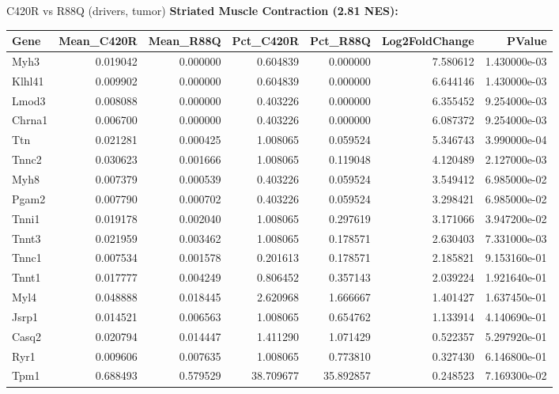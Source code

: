 \documentclass[10pt, aspectratio=169]{beamer}
\begin{document}
\begin{frame}{C420R vs R88Q (drivers, tumor)}
  \centering
  {\small \textbf{Striated Muscle Contraction (2.81 NES):}}\par
  \vspace{0.15cm}
  \tiny
  \begin{tabular}{l r r r r r r}
    \toprule
    \textbf{Gene} & \textbf{Mean\_C420R} & \textbf{Mean\_R88Q} & \textbf{Pct\_C420R} & \textbf{Pct\_R88Q} & \textbf{Log2FoldChange} & \textbf{PValue} \\
    \midrule
    Myh3 & 0.019042 & 0.000000 & 0.604839 & 0.000000 & 7.580612 & 1.430000e-03 \\
    Klhl41 & 0.009902 & 0.000000 & 0.604839 & 0.000000 & 6.644146 & 1.430000e-03 \\
    Lmod3 & 0.008088 & 0.000000 & 0.403226 & 0.000000 & 6.355452 & 9.254000e-03 \\
    Chrna1 & 0.006700 & 0.000000 & 0.403226 & 0.000000 & 6.087372 & 9.254000e-03 \\
    Ttn & 0.021281 & 0.000425 & 1.008065 & 0.059524 & 5.346743 & 3.990000e-04 \\
    Tnnc2 & 0.030623 & 0.001666 & 1.008065 & 0.119048 & 4.120489 & 2.127000e-03 \\
    Myh8 & 0.007379 & 0.000539 & 0.403226 & 0.059524 & 3.549412 & 6.985000e-02 \\
    Pgam2 & 0.007790 & 0.000702 & 0.403226 & 0.059524 & 3.298421 & 6.985000e-02 \\
    Tnni1 & 0.019178 & 0.002040 & 1.008065 & 0.297619 & 3.171066 & 3.947200e-02 \\
    Tnnt3 & 0.021959 & 0.003462 & 1.008065 & 0.178571 & 2.630403 & 7.331000e-03 \\
    Tnnc1 & 0.007534 & 0.001578 & 0.201613 & 0.178571 & 2.185821 & 9.153160e-01 \\
    Tnnt1 & 0.017777 & 0.004249 & 0.806452 & 0.357143 & 2.039224 & 1.921640e-01 \\
    Myl4 & 0.048888 & 0.018445 & 2.620968 & 1.666667 & 1.401427 & 1.637450e-01 \\
    Jsrp1 & 0.014521 & 0.006563 & 1.008065 & 0.654762 & 1.133914 & 4.140690e-01 \\
    Casq2 & 0.020794 & 0.014447 & 1.411290 & 1.071429 & 0.522357 & 5.297920e-01 \\
    Ryr1 & 0.009606 & 0.007635 & 1.008065 & 0.773810 & 0.327430 & 6.146800e-01 \\
    Tpm1 & 0.688493 & 0.579529 & 38.709677 & 35.892857 & 0.248523 & 7.169300e-02 \\
    \bottomrule
  \end{tabular}
\end{frame}
\end{document}
